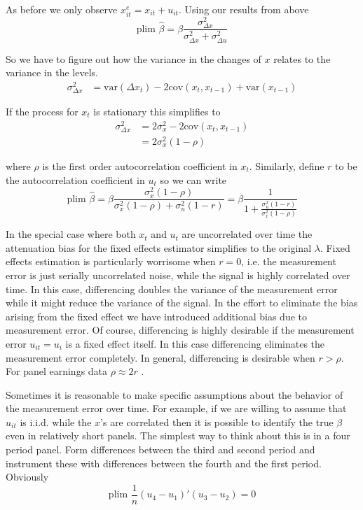 \documentclass[12pt]{article}
\begin{document}
As before we only observe $x_{it}^{e} = x_{it} + u_{it}$. Using our results from above
\[
\text{plim } \hat{\beta} = \beta \frac{\sigma_{\Delta x}^2}{\sigma_{\Delta x}^2 + \sigma_{\Delta u}^2}
\]

So we have to figure out how the variance in the changes of $x$ relates to the variance in the levels.
\begin{align*}
\sigma_{\Delta x}^2 &= \text{var}(\Delta x_t) - 2\text{cov}(x_t, x_{t-1}) + \text{var}(x_{t-1})
\end{align*}

If the process for $x_t$ is stationary this simplifies to
\begin{align*}
\sigma_{\Delta x}^2 &= 2\sigma_x^2 - 2\text{cov}(x_t, x_{t-1})\\
&= 2\sigma_x^2(1 - \rho)
\end{align*}

where $\rho$ is the first order autocorrelation coefficient in $x_t$. Similarly, define $r$ to be the autocorrelation coefficient in $u_t$ so we can write
\[
\text{plim } \hat{\beta} = \beta \frac{\sigma_x^2(1 - \rho)}{\sigma_x^2(1 - \rho) + \sigma_u^2(1 - r)} = \beta \frac{1}{1 + \frac{\sigma_u^2(1-r)}{\sigma_x^2(1-\rho)}}
\]

In the special case where both $x_t$ and $u_t$ are uncorrelated over time the attenuation bias for the fixed effects estimator simplifies to the original $\lambda$. Fixed effects estimation is particularly worrisome when $r = 0$, i.e. the measurement error is just serially uncorrelated noise, while the signal is highly correlated over time. In this case, differencing doubles the variance of the measurement error while it might reduce the variance of the signal. In the effort to eliminate the bias arising from the fixed effect we have introduced additional bias due to measurement error. Of course, differencing is highly desirable if the measurement error $u_{it} = u_i$ is a fixed effect itself. In this case differencing eliminates the measurement error completely. In general, differencing is desirable when $r > \rho$. For panel earnings data $\rho \approx 2r$ \cite{Bound_etal_1994, Bound_Krueger_1991}.

Sometimes it is reasonable to make specific assumptions about the behavior of the measurement error over time. For example, if we are willing to assume that $u_{it}$ is i.i.d. while the $x$'s are correlated then it is possible to identify the true $\beta$ even in relatively short panels. The simplest way to think about this is in a four period panel. Form differences between the third and second period and instrument these with differences between the fourth and the first period. Obviously
\[
\text{plim } \frac{1}{n}(u_4 - u_1)'(u_3 - u_2) = 0
\]
\end{document}

